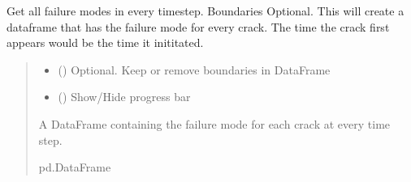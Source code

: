 \documentclass[letterpaper,10pt,english]{sphinxmanual}
\begin{document}
\begin{fulllineitems}
\begin{fulllineitems}
\begin{quote}
\begin{description}
\end{description}\end{quote}

\end{fulllineitems}


\begin{fulllineitems}
\label{\detokenize{openfdem:openfdem.openfdem.Model.crack_failure_mode}}
\pysigstartsignatures
{}
\pysigstopsignatures
\sphinxAtStartPar
Get all failure modes in every timestep. Boundaries Optional.
This will create a dataframe that has the failure mode for every crack. The time the crack first appears would be the time it inititated.
\begin{quote}\begin{description}
\begin{itemize}
\item {} 
\sphinxAtStartPar
{} () \textendash{} Optional. Keep or remove boundaries in DataFrame

\item {} 
\sphinxAtStartPar
{} () \textendash{} Show/Hide progress bar

\end{itemize}

\sphinxAtStartPar
A DataFrame containing the failure mode for each crack at every time step.

\sphinxAtStartPar
pd.DataFrame

\end{description}\end{quote}

\begin{sphinxVerbatim}[commandchars=\\\{\}]
   
  
  
\end{sphinxVerbatim}


\end{fulllineitems}
\end{fulllineitems}
\end{document}

